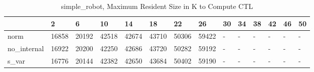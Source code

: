 \begin{table}
\caption{simple_robot, Maximum Resident Size in K to Compute CTL}
\label{simple_robot_CTL_size}
\begin{tabular}{llllllllllllll}
\toprule
 & 2 & 6 & 10 & 14 & 18 & 22 & 26 & 30 & 34 & 38 & 42 & 46 & 50 \\
\midrule
norm & 16858 & 20192 & 42518 & 42674 & 43710 & 50306 & 59422 & - & - & - & - & - & - \\
no_internal & 16922 & 20200 & 42250 & 42686 & 43720 & 50282 & 59192 & - & - & - & - & - & - \\
s_var & 16776 & 20144 & 42382 & 42650 & 43684 & 50402 & 59190 & - & - & - & - & - & - \\
\bottomrule
\end{tabular}
\end{table}
